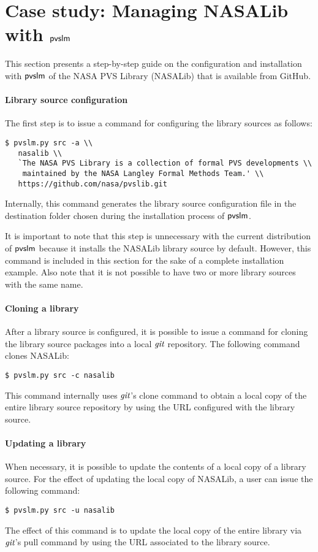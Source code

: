 \section{Case study: Managing NASALib with $\textsf{pvslm}$}
\label{sec.nasalib}

This section presents a step-by-step guide on the configuration and
installation with $\textsf{pvslm}$ of the NASA PVS Library (NASALib) that is
available from GitHub.

\paragraph{Library source configuration}
The first step is to issue a command for configuring the library sources
as follows:
%
{\small
\begin{lstlisting}
$ pvslm.py src -a \\
   nasalib \\
   `The NASA PVS Library is a collection of formal PVS developments \\
    maintained by the NASA Langley Formal Methods Team.' \\
   https://github.com/nasa/pvslib.git
\end{lstlisting}
}
%
Internally, this command generates the library source
configuration file in the destination folder chosen during the
installation process of $\textsf{pvslm}$.

It is important to note that this step is unnecessary with the current
distribution of $\textsf{pvslm}$ because it installs the NASALib library
source by default.  However, this command is included in this section
for the sake of a complete installation example. Also note that it is
not possible to have two or more library sources with the same name.

\paragraph{Cloning a library} After a library source
is configured, it is possible to issue a command for cloning the
library source packages into a local $\textit{git}$ repository. The following
command clones NASALib:
%
\begin{verbatim}
$ pvslm.py src -c nasalib
\end{verbatim}
%
This command internally uses $\textit{git}$'s clone command to obtain a local
copy of the entire library source repository by using the URL
configured with the library source.

\paragraph{Updating a library} When necessary, it is possible to update
the contents of a local copy of a library source. For the effect of
updating the local copy of NASALib, a user can issue the following
command:
%
\begin{verbatim}
$ pvslm.py src -u nasalib
\end{verbatim}
%
The effect of this command is to update the local copy of the entire
library via $\textit{git}$'s pull command by using the URL associated to
the library source.

